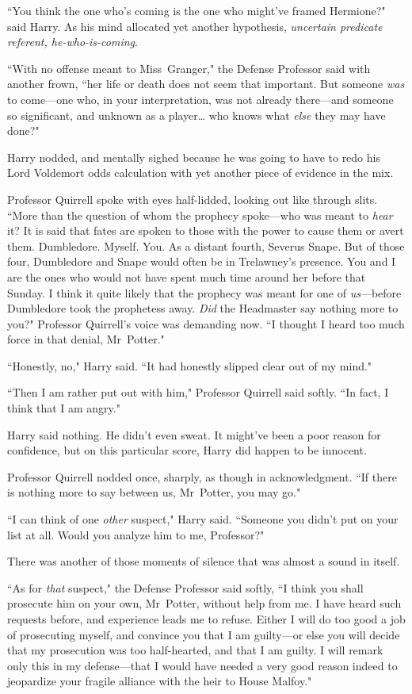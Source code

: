 ``You think the one who's coming is the one who might've framed Hermione?" said Harry. As his mind allocated yet another hypothesis, \emph{uncertain predicate referent, he-who-is-coming}.

``With no offense meant to Miss~Granger," the Defense Professor said with another frown, ``her life or death does not seem that important. But someone \emph{was} to come—one who, in your interpretation, was not already there—and someone so significant, and unknown as a player{\ldots} who knows what \emph{else} they may have done?"

Harry nodded, and mentally sighed because he was going to have to redo his Lord Voldemort odds calculation with yet another piece of evidence in the mix.

Professor Quirrell spoke with eyes half-lidded, looking out like through slits. ``More than the question of whom the prophecy spoke—who was meant to \emph{hear} it? It is said that fates are spoken to those with the power to cause them or avert them. Dumbledore. Myself. You. As a distant fourth, Severus Snape. But of those four, Dumbledore and Snape would often be in Trelawney's presence. You and I are the ones who would not have spent much time around her before that Sunday. I think it quite likely that the prophecy was meant for one of \emph{us}—before Dumbledore took the prophetess away. \emph{Did} the Headmaster say nothing more to you?" Professor Quirrell's voice was demanding now. ``I thought I heard too much force in that denial, Mr~Potter."

``Honestly, no," Harry said. ``It had honestly slipped clear out of my mind."

``Then I am rather put out with him," Professor Quirrell said softly. ``In fact, I think that I am angry."

Harry said nothing. He didn't even sweat. It might've been a poor reason for confidence, but on this particular score, Harry did happen to be innocent.

Professor Quirrell nodded once, sharply, as though in acknowledgment. ``If there is nothing more to say between us, Mr~Potter, you may go."

``I can think of one \emph{other} suspect," Harry said. ``Someone you didn't put on your list at all. Would you analyze him to me, Professor?"

There was another of those moments of silence that was almost a sound in itself.

``As for \emph{that} suspect," the Defense Professor said softly, ``I think you shall prosecute him on your own, Mr~Potter, without help from me. I have heard such requests before, and experience leads me to refuse. Either I will do too good a job of prosecuting myself, and convince you that I am guilty—or else you will decide that my prosecution was too half-hearted, and that I am guilty. I will remark only this in my defense—that I would have needed a very good reason indeed to jeopardize your fragile alliance with the heir to House Malfoy."

